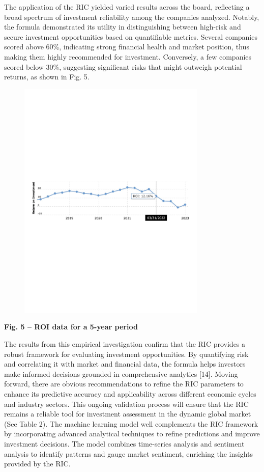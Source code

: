 {The application of the RIC yielded varied results across the board,
reflecting a broad spectrum of investment reliability among the
companies analyzed. Notably, the formula demonstrated its utility in
distinguishing between high-risk and secure investment opportunities
based on quantifiable metrics. Several companies scored above 60\%,
indicating strong financial health and market position, thus making them
highly recommended for investment. Conversely, a few companies scored
below 30\%, suggesting significant risks that might outweigh potential
returns, as shown in Fig. 5.

\begin{figure}[H]
	\centering
	\includegraphics[width=0.8\textwidth]{media/ict2/image13}
	\caption*{}
\end{figure}


{\bfseries Fig. 5 -- ROI data for a 5-year period}

The results from this empirical investigation confirm that the RIC
provides a robust framework for evaluating investment opportunities. By
quantifying risk and correlating it with market and financial data, the
formula helps investors make informed decisions grounded in
comprehensive analytics {[}14{]}. Moving forward, there are obvious
recommendations to refine the RIC parameters to enhance its predictive
accuracy and applicability across different economic cycles and industry
sectors. This ongoing validation process will ensure that the RIC
remains a reliable tool for investment assessment in the dynamic global
market (See Table 2). The machine learning model well complements the
RIC framework by incorporating advanced analytical techniques to refine
predictions and improve investment decisions. The model combines
time-series analysis and sentiment analysis to identify patterns and
gauge market sentiment, enriching the insights provided by the RIC.

}
